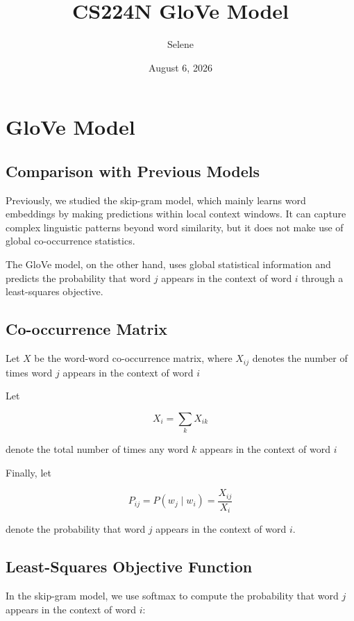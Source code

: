 \documentclass[
  a4paper,
  10pt]{article}
\title{CS224N \textbar{} GloVe Model}
\author{Selene}
\date{August 6, 2026}
\begin{document}
\maketitle

\section{GloVe Model}\label{glove-model}

\subsection{Comparison with Previous
Models}\label{comparison-with-previous-models}

Previously, we studied the skip-gram model, which mainly learns word
embeddings by making predictions within local context windows. It can
capture complex linguistic patterns beyond word similarity, but it does
not make use of global co-occurrence statistics.

The GloVe model, on the other hand, uses global statistical information
and predicts the probability that word \(j\) appears in the context of
word \(i\) through a least-squares objective.

\subsection{Co-occurrence Matrix}\label{co-occurrence-matrix}

Let \(X\) be the word-word co-occurrence matrix, where \(X_{ij}\)
denotes the number of times word \(j\) appears in the context of word
\(i\)

Let

\[
X_i = \sum_k X_{ik}
\]

denote the total number of times any word \(k\) appears in the context
of word \(i\)

Finally, let

\[
P_{ij}=P(w_j \mid w_i)=\frac{X_{ij}}{X_i}
\]

denote the probability that word \(j\) appears in the context of word
\(i\).

\subsection{Least-Squares Objective
Function}\label{least-squares-objective-function}

In the skip-gram model, we use softmax to compute the probability that
word \(j\) appears in the context of word \(i\):
\end{document}
